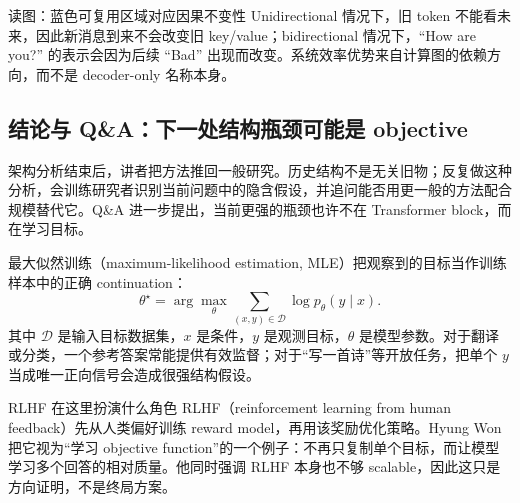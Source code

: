 \begin{knowledgebox}{读图：蓝色可复用区域对应因果不变性}
Unidirectional 情况下，旧 token 不能看未来，因此新消息到来不会改变旧 key/value；bidirectional 情况下，``How are you?'' 的表示会因为后续 ``Bad'' 出现而改变。系统效率优势来自计算图的依赖方向，而不是 decoder-only 名称本身。
\end{knowledgebox}


\subsection{结论与 Q\&A：下一处结构瓶颈可能是 objective}

架构分析结束后，讲者把方法推回一般研究。历史结构不是无关旧物；反复做这种分析，会训练研究者识别当前问题中的隐含假设，并追问能否用更一般的方法配合规模替代它。Q\&A 进一步提出，当前更强的瓶颈也许不在 Transformer block，而在学习目标。



最大似然训练（maximum-likelihood estimation, MLE）把观察到的目标当作训练样本中的正确 continuation：
\[
\theta^{\star}=\arg\max_{\theta}\sum_{(x,y)\in\mathcal{D}}\log p_{\theta}(y\mid x).
\]
其中 $\mathcal{D}$ 是输入目标数据集，$x$ 是条件，$y$ 是观测目标，$\theta$ 是模型参数。对于翻译或分类，一个参考答案常能提供有效监督；对于“写一首诗”等开放任务，把单个 $y$ 当成唯一正向信号会造成很强结构假设。

\begin{knowledgebox}{RLHF 在这里扮演什么角色}
RLHF（reinforcement learning from human feedback）先从人类偏好训练 reward model，再用该奖励优化策略。Hyung Won 把它视为“学习 objective function”的一个例子：不再只复制单个目标，而让模型学习多个回答的相对质量。他同时强调 RLHF 本身也不够 scalable，因此这只是方向证明，不是终局方案。
\end{knowledgebox}


